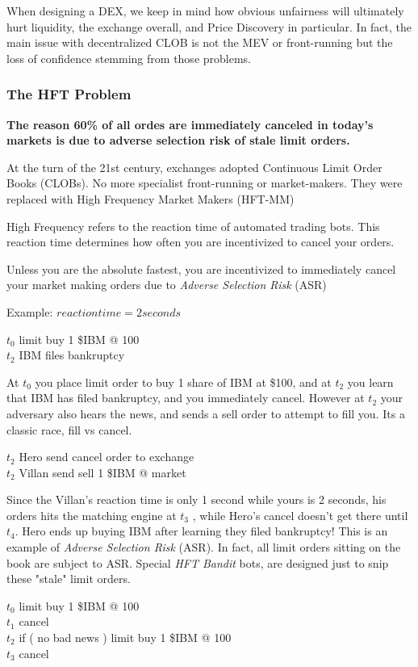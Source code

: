 \documentclass[12pt]{article}
\begin{document}
When designing a DEX, we keep in mind how obvious unfairness will ultimately hurt liquidity, the exchange overall, and Price Discovery in particular. In fact, the main issue with decentralized CLOB is not the MEV or front-running but the loss of confidence stemming from those problems.  


\subsubsection*{The HFT Problem}
\textbf{The reason 60\% of all ordes are immediately canceled in today's markets is due to adverse selection risk of stale limit orders.} 

At the turn of the 21st century, exchanges adopted  Continuous Limit Order Books (CLOBs). No more specialist front-running or market-makers. They were replaced with High Frequency Market Makers (HFT-MM) 

High Frequency refers to the reaction time of automated trading bots. This reaction time determines how often you are incentivized to cancel your orders. 

Unless you are the absolute fastest, you are incentivized to immediately cancel your market making orders due to \emph{Adverse Selection Risk} (ASR)  

Example: \( reaction time = 2 seconds \) 

$t_0$ limit buy 1 \$IBM @ 100 \\
$t_2$ IBM files bankruptcy 

At $t_0$ you place limit order to buy 1 share of IBM at \$100, and at $t_2$ you learn that IBM has filed bankruptcy, and you immediately cancel. However at $t_2$ your adversary also hears the news, and sends a sell order to attempt to fill you. Its a classic race, fill vs cancel.

$t_2$ Hero send cancel order to exchange  \\
$t_2$ Villan send sell 1 \$IBM @ market  

Since the Villan's reaction time is only 1 second while yours is 2 seconds, his orders hits the matching engine at $t_3$ , while Hero's cancel doesn't get there until $t_4$. Hero ends up buying IBM after learning they filed bankruptcy! This is an example of \emph{Adverse Selection Risk} (ASR). In fact, all limit orders sitting on the book are subject to ASR. Special \emph{HFT Bandit} bots, are designed just to snip these "stale" limit orders. 

$t_0$ limit buy 1 \$IBM @ 100 \\
$t_1$ cancel \\
$t_2$ if ( no bad news ) limit buy 1 \$IBM @ 100 \\
$t_3$ cancel 
\end{document}
